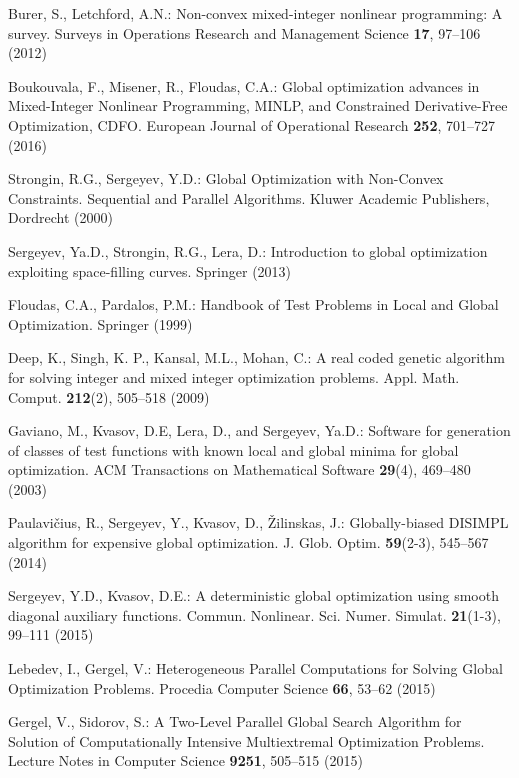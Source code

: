 \documentclass{llncs}
\begin{document}
\begin{thebibliography}{10}

Burer, S., Letchford, A.N.: Non-convex mixed-integer nonlinear programming: A survey. Surveys in Operations Research and Management Science \textbf{17}, 97--106 (2012) 

Boukouvala, F., Misener, R., Floudas, C.A.: Global optimization advances in Mixed-Integer Nonlinear Programming, MINLP, and Constrained Derivative-Free Optimization, CDFO. European Journal of Operational Research \textbf{252}, 701--727 (2016) 

Strongin, R.G., Sergeyev, Y.D.: Global Optimization with Non-Convex Constraints. Sequential and Parallel Algorithms. Kluwer Academic Publishers, Dordrecht (2000) %

Sergeyev, Ya.D., Strongin, R.G., Lera, D.: Introduction to global optimization exploiting space-filling curves. Springer (2013) %

Floudas, C.A., Pardalos, P.M.:  Handbook of Test Problems in Local and Global Optimization. Springer (1999)  %

Deep, K., Singh, K. P., Kansal, M.L., Mohan, C.: A real coded genetic algorithm for solving integer and mixed integer optimization problems. Appl. Math. Comput. \textbf{212}(2), 505--518 (2009)

Gaviano, M., Kvasov, D.E, Lera, D., and Sergeyev, Ya.D.: Software for generation of classes of test functions with known local and global minima for global optimization. ACM Transactions on Mathematical Software \textbf{29}(4), 469--480 (2003)

Paulavi\v{c}ius, R., Sergeyev, Y., Kvasov, D., \v{Z}ilinskas, J.: Globally-biased DISIMPL algorithm for expensive global optimization. J. Glob. Optim. \textbf{59}(2-3), 545--567 (2014)

Sergeyev, Y.D., Kvasov, D.E.: A deterministic global optimization using smooth diagonal auxiliary functions. Commun. Nonlinear. Sci. Numer. Simulat. \textbf{21}(1-3), 99--111 (2015)

Lebedev, I., Gergel, V.: Heterogeneous Parallel Computations for Solving Global Optimization Problems. Procedia Computer Science \textbf{66}, 53--62 (2015)

Gergel, V., Sidorov, S.: A Two-Level Parallel Global Search Algorithm for Solution of Computationally Intensive Multiextremal Optimization Problems. Lecture Notes in Computer Science  \textbf{9251}, 505--515 (2015)


\end{thebibliography}
\end{document}
